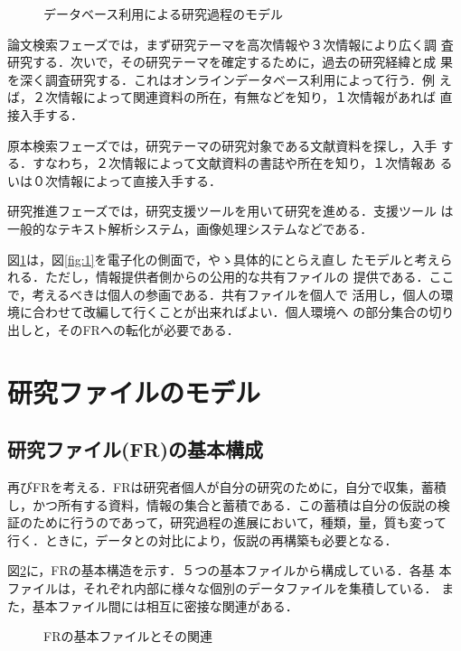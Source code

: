 \begin{figure}[htb]

\begin{center}
  
  \caption{データベース利用による研究過程のモデル}\label{fig:2}
\end{center}
\end{figure}

論文検索フェーズでは，まず研究テーマを高次情報や３次情報により広く調
査研究する．次いで，その研究テーマを確定するために，過去の研究経緯と成
果を深く調査研究する．これはオンラインデータベース利用によって行う．例
えば，２次情報によって関連資料の所在，有無などを知り，１次情報があれば
直接入手する．

原本検索フェーズでは，研究テーマの研究対象である文献資料を探し，入手
する．すなわち，２次情報によって文献資料の書誌や所在を知り，１次情報あ
るいは０次情報によって直接入手する．

研究推進フェーズでは，研究支援ツールを用いて研究を進める．支援ツール
は一般的なテキスト解析システム，画像処理システムなどである．

図\ref{fig:2}は，図\ref{fig:1}を電子化の側面で，やゝ具体的にとらえ直し
たモデルと考えられる．ただし，情報提供者側からの公用的な共有ファイルの
提供である．ここで，考えるべきは個人の参画である．共有ファイルを個人で
活用し，個人の環境に合わせて改編して行くことが出来ればよい．個人環境へ
の部分集合の切り出しと，そのFRへの転化が必要である．

\section{研究ファイルのモデル}

\subsection{研究ファイル(FR)の基本構成}
再びFRを考える．FRは研究者個人が自分の研究のために，自分で収集，蓄積
し，かつ所有する資料，情報の集合と蓄積である．この蓄積は自分の仮説の検
証のために行うのであって，研究過程の進展において，種類，量，質も変って
行く．ときに，データとの対比により，仮説の再構築も必要となる．

図\ref{fig:3}に，FRの基本構造を示す．５つの基本ファイルから構成している．各基
本ファイルは，それぞれ内部に様々な個別のデータファイルを集積している．
また，基本ファイル間には相互に密接な関連がある．

\begin{figure}[htb]
\begin{center}
  
  \caption{FRの基本ファイルとその関連}\label{fig:3}
\end{center}
\end{figure}

